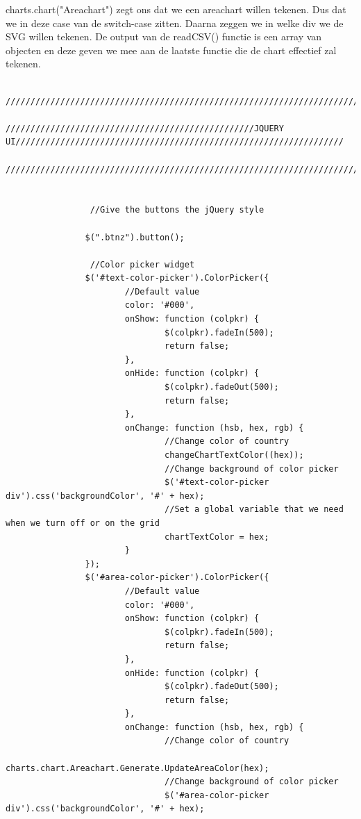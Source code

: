 charts.chart("Areachart") zegt ons dat we een areachart willen tekenen. Dus dat we in deze case van de switch-case zitten. Daarna zeggen we in welke div we de SVG willen tekenen.
De output van de readCSV() functie is een array van objecten en deze geven we mee aan de laatste functie die de chart effectief zal tekenen.
\begin{lstlisting}
                 /////////////////////////////////////////////////////////////////////////////////////////////////////////////////////////////
                 //////////////////////////////////////////////////JQUERY UI//////////////////////////////////////////////////////////////////
                 /////////////////////////////////////////////////////////////////////////////////////////////////////////////////////////////


                 //Give the buttons the jQuery style

                $(".btnz").button();

                 //Color picker widget
                $('#text-color-picker').ColorPicker({
                        //Default value
                        color: '#000',
                        onShow: function (colpkr) {
                                $(colpkr).fadeIn(500);
                                return false;
                        },
                        onHide: function (colpkr) {
                                $(colpkr).fadeOut(500);
                                return false;
                        },
                        onChange: function (hsb, hex, rgb) {
                                //Change color of country
                                changeChartTextColor((hex));
                                //Change background of color picker
                                $('#text-color-picker div').css('backgroundColor', '#' + hex);
                                //Set a global variable that we need when we turn off or on the grid
                                chartTextColor = hex;
                        }
                });
                $('#area-color-picker').ColorPicker({
                        //Default value
                        color: '#000',
                        onShow: function (colpkr) {
                                $(colpkr).fadeIn(500);
                                return false;
                        },
                        onHide: function (colpkr) {
                                $(colpkr).fadeOut(500);
                                return false;
                        },
                        onChange: function (hsb, hex, rgb) {
                                //Change color of country
                                charts.chart.Areachart.Generate.UpdateAreaColor(hex);
                                //Change background of color picker
                                $('#area-color-picker div').css('backgroundColor', '#' + hex);


\end{lstlisting}
